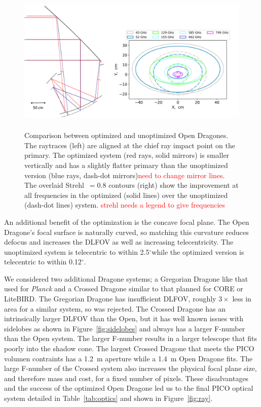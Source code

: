 \documentclass[]{spie}  %
\newcommand{\comr}[1]{\textcolor{red}{#1}}
\newcommand{\dgr}{$^\circ$}
\begin{document}
\begin{figure} [ht]
\begin{center}
\includegraphics[height=7cm]{jpl_vs_V3D.png}
\end{center}
\caption { \label{fig:compare} 
Comparison between optimized and unoptimized Open Dragones.  The raytraces (left) are aligned at the chief ray impact point on the primary. 
The optimized system (red rays, solid mirrors) is smaller vertically and has a slightly flatter primary than the unoptimized version 
(blue rays, dash-dot mirrors)\comr{need to change mirror lines}. The overlaid Strehl~$=0.8$ contours (right) show the improvement at 
all frequencies in the optimized (solid lines) over the unoptimized (dash-dot lines) system. \comr{strehl needs a legend to give frequencies}
}
\end{figure} 

An additional benefit of the optimization is the concave focal plane. The Open Dragone's focal surface is naturally curved, so matching this 
curvature reduces defocus and increases the DLFOV as well as increasing telecentricity.  The unoptimized system is telecentric to within 
2.5\dgr while the optimized version is telecentric to within 0.12\dgr.

We considered two additional Dragone systems; a Gregorian Dragone like that used for \textit{Planck} and a Crossed Dragone similar to that planned 
for CORE or LiteBIRD.  The Gregorian Dragone has insufficient DLFOV\cite{core2018_inst}, roughly $3\times$ less in area for a similar system, so was rejected.  
The Crossed Dragone has an intrinsically larger DLFOV than the Open, but it has well 
known issues with sidelobes as shown in Figure~\ref{fig:sidelobes} and always has a larger F-number than the Open system.  The larger 
F-number results in a larger telescope that fits poorly into the shadow cone. The largest Crossed Dragone that meets the PICO volumen contraints has 
a 1.2~m aperture while a 1.4~m Open Dragone fits. The large F-number of the Crossed system also increases 
the physical focal plane size, and therefore mass and cost, for a fixed number of pixels.  These disadvantages and the success of the optimized 
Open Dragone led us to the final PICO optical system detailed in Table~\ref{tab:optics} and shown in Figure~\ref{fig:ray}.
\end{document}
